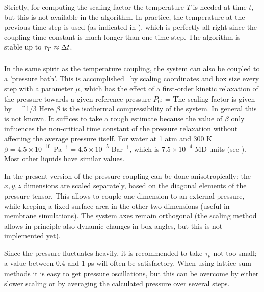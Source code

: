 Strictly,  for computing the scaling factor the temperature $T$ is
needed at time $t$, but this is not available in the algorithm. In
practice, the temperature at the previous time step is used (as
indicated in ), which is
perfectly all right since the coupling time constant is much longer
than one time step. The algorithm is stable up to $\tau_T \approx {\Delta t}$.

\subsubsection*{}
In the same spirit as the temperature coupling, the system can also be
coupled to a 'pressure bath'. 
This is accomplished~\cite{Berendsen84} by scaling
coordinates and box size every step with a parameter $\mu$, which has
the effect of a first-order kinetic relaxation of the pressure towards
a given reference pressure $P_0$:
\beq
{} = 
\eeq
The scaling factor is given by
\beq
\mu = ^{1/3}
\label{eqn:mu}
\eeq
Here $\beta$ is the isothermal compressibility of the system. In general
this is not known. It suffices to take a rough estimate because the
value of $\beta$ only influences the non-critical time constant of the
pressure relaxation without affecting the average pressure itself. For
water at 1 atm and 300 K 
$\beta = 4.5 \times 10^{-10}$ Pa$^{-1} = 4.5 \times 10^{-5}$ Bar$^{-1}$,
which is $7.5 \times 10^{-4}$ MD units (see ).
Most other liquids have similar values.

In the present version of {\gromacs} the pressure coupling can be done
anisotropically: the $x,y,z$ dimensions are scaled separately, based
on the diagonal elements of the pressure tensor. This allows {\eg}  to couple
one dimension to an external pressure, while keeping a fixed surface
area in the other two dimensions (useful in membrane simulations). The
system  axes remain orthogonal (the scaling method allows in principle
also  dynamic changes in box angles, but this is not implemented yet).

Since the pressure fluctuates heavily, it is recommended to take
$\tau_p$ not too small; a value between 0.4 and 1 ps will often be
satisfactory. When using lattice sum methods it is easy to get pressure
oscillations, but this can be overcome by either slower scaling or by
averaging the calculated pressure over several steps.

